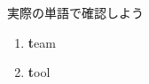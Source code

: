 \documentclass[aspectratio=169, xcolor={dvipsnames,table}]{beamer}
\begin{document}
\begin{frame}[plain]{実際の単語で確認しよう }
\begin{enumerate}[<+->]
    \item \textcolor{NavyBlue}{\bfseries t}eam\hfill
          \hspace{150pt}\mbox{}

    \item \textcolor{NavyBlue}{\bfseries t}ool\hfill
          \hspace{150pt}\mbox{}
  \end{enumerate}
\end{frame}
\end{document}
